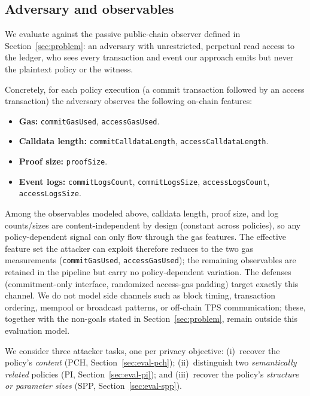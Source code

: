 \subsection{Adversary and observables}
\label{sec:eval-threat}

We evaluate against the passive public-chain observer defined in Section~\ref{sec:problem}: an adversary with unrestricted, perpetual read access to the ledger, who sees every transaction and event our approach emits but never the plaintext policy or the witness.

Concretely, for each policy execution (a commit transaction followed by an access transaction) the adversary observes the following on-chain features:
%
\begin{itemize}
  \item \textbf{Gas:} \texttt{commitGasUsed}, \texttt{accessGasUsed}.
  \item \textbf{Calldata length:} \texttt{commitCalldataLength}, \texttt{accessCalldataLength}.
  \item \textbf{Proof size:} \texttt{proofSize}.
  \item \textbf{Event logs:} \texttt{commitLogsCount}, \texttt{commitLogsSize},
    \texttt{accessLogsCount}, \texttt{accessLogsSize}.
\end{itemize}
%
Among the observables modeled above, calldata length, proof size, and log counts/sizes are content-independent by design (constant across policies), so any policy-dependent signal can only flow through the gas features.
The effective feature set the attacker can exploit therefore reduces to the two gas measurements (\texttt{commitGasUsed}, \texttt{accessGasUsed}); the remaining observables are retained in the pipeline but carry no policy-dependent variation. 
The defenses (commitment-only interface, randomized access-gas padding) target exactly this channel. 
We do not model side channels such as block timing, transaction ordering, mempool or broadcast patterns, or off-chain TPS communication; these, together with the non-goals stated in Section~\ref{sec:problem}, remain outside this evaluation model.

We consider three attacker tasks, one per privacy objective:
(i)~recover the policy's \emph{content} (PCH, Section~\ref{sec:eval-pch}); (ii)~distinguish two
\emph{semantically related} policies (PI, Section~\ref{sec:eval-pi}); and
(iii)~recover the policy's \emph{structure or parameter sizes} (SPP,
Section~\ref{sec:eval-spp}).
